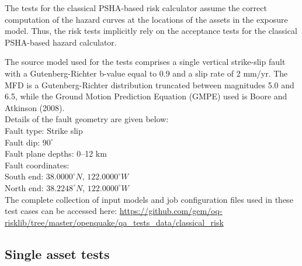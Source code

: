 The tests for the classical PSHA-based risk calculator assume the correct computation of the hazard curves at the locations of the assets in the exposure model. Thus, the risk tests implicitly rely on the acceptance tests for the classical PSHA-based hazard calculator.

The source model used for the tests comprises a single vertical strike-slip fault with a Gutenberg-Richter b-value equal to 0.9 and a slip rate of 2 mm/yr. The MFD is a Gutenberg-Richter distribution truncated between magnitudes 5.0 and 6.5, while the Ground Motion Prediction Equation (GMPE) used is Boore and Atkinson (2008).\\

\noindent Details of the fault geometry are given below:\\

\noindent
Fault type: Strike slip\\
Fault dip: $90^{\circ}$\\
Fault plane depths: 0--12 km\\
Fault coordinates:\\
South end: $38.0000^{\circ} N$, $122.0000^{\circ} W$\\
North end: $38.2248^{\circ} N$, $122.0000^{\circ} W$\\

The complete collection of input models and job configuration files used in these test cases can be accessed here:
\href{https://github.com/gem/oq-risklib/tree/master/openquake/qa_tests_data/classical_risk}
{https://github.com/gem/oq-risklib/tree/master/openquake/qa\_tests\_data/classical\_risk}

\subsection{Single asset tests}
\label{subsec:acc-cr-single}


% 

% 

% 
